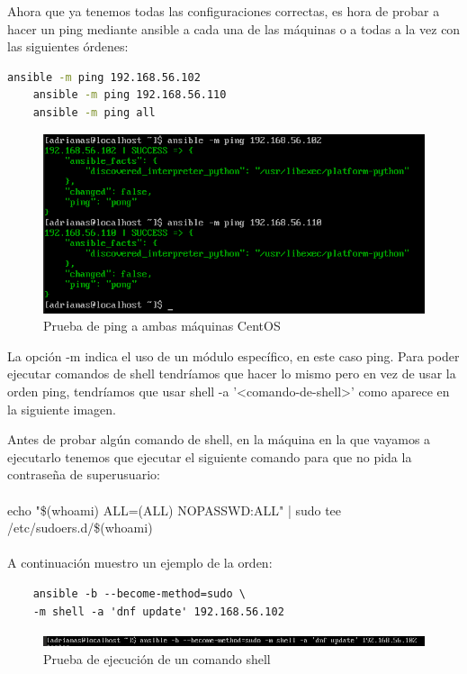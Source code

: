 {\newpage
Ahora que ya tenemos todas las configuraciones correctas, es hora de probar a hacer un ping mediante ansible a cada una de las máquinas o a todas a la vez con las siguientes órdenes:

\begin{lstlisting}[language=bash]
	ansible -m ping 192.168.56.102
	ansible -m ping 192.168.56.110
	ansible -m ping all
\end{lstlisting}

\begin{figure}[H]
	\centering
	\includegraphics[scale=0.4]{graphics/img17}
	\caption{Prueba de ping a ambas máquinas CentOS}
\end{figure}

La opción -m indica el uso de un módulo específico, en este caso ping. Para poder ejecutar comandos de shell tendríamos que hacer lo mismo pero en vez de usar la orden ping, tendríamos que usar shell -a '<comando-de-shell>' como aparece en la siguiente imagen.

Antes de probar algún comando de shell, en la máquina en la que vayamos a ejecutarlo tenemos que ejecutar el siguiente comando para que no pida la contraseña de superusuario:
\\\\
echo "\$(whoami) ALL=(ALL) NOPASSWD:ALL" | sudo tee /etc/sudoers.d/\$(whoami)
\\\\
A continuación muestro un ejemplo de la orden:

\begin{lstlisting}
	ansible -b --become-method=sudo \
	-m shell -a 'dnf update' 192.168.56.102
\end{lstlisting}

\begin{figure}[H]
	\centering
	\includegraphics[scale=0.4]{graphics/img18}
	\caption{Prueba de ejecución de un comando shell}
\end{figure}

}
